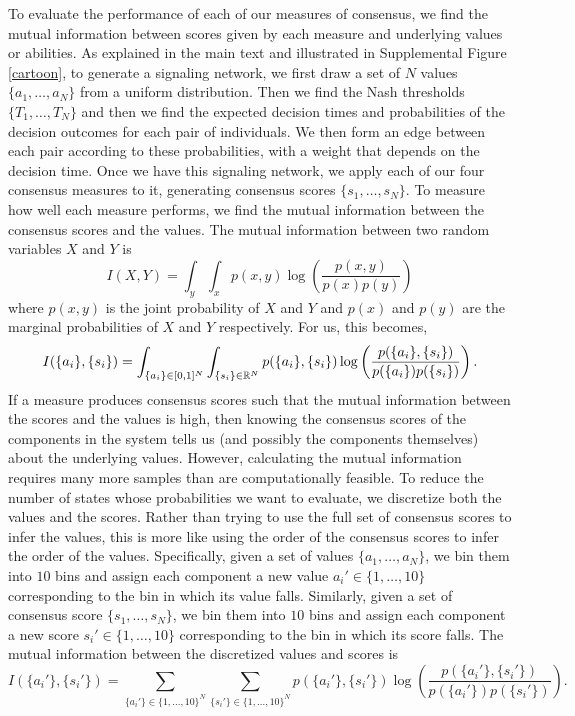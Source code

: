 \documentclass{article}
\begin{document}
To evaluate the performance of each of our measures of consensus, we find the mutual information between scores given by each measure and underlying values or abilities.  As explained in the main text and illustrated in Supplemental Figure \ref{cartoon}, to generate a signaling network, we first draw a set of $N$ values $\{a_1,\dots,a_N\}$ from a uniform distribution. Then we find the Nash thresholds $\{T_1,\dots,T_N\}$ and then we find the expected decision times and probabilities of the decision outcomes for each pair of individuals. We then form an edge between each pair according to these probabilities, with a weight that depends on the decision time.  Once we have this signaling network, we apply each of our four consensus measures to it, generating consensus scores $\{s_1,\dots,s_N\}$.  To measure how well each measure performs, we find the mutual information between the consensus scores and the values. The mutual information between two random variables $X$ and $Y$ is 
\begin{equation}
I(X,Y)=\int_{y}\int_{x}p(x,y)\log\left(\frac{p(x,y)}{p(x)p(y)}\right)
\end{equation}
where $p(x,y)$ is the joint probability of $X$ and $Y$ and $p(x)$ and $p(y)$ are the marginal probabilities of $X$ and $Y$ respectively. For us, this becomes,
\begin{equation}
I(\{a_i\},\{s_i\})=\int_{\{a_i\}\in[0,1]^N}\int_{\{s_i\}\in{\mathbb{R}}^N}p(\{a_i\},\{s_i\})\log\left(\frac{p(\{a_i\},\{s_i\})}{p(\{a_i\})p(\{s_i\})}\right).
\end{equation}
If a measure produces consensus scores such that the mutual information between the scores and the values is high, then knowing the consensus scores of the components in the system tells us (and possibly the components themselves) about the underlying values.  However, calculating the mutual information requires many more samples than are computationally feasible.  To reduce the number of states whose probabilities we want to evaluate, we discretize both the values and the scores.  Rather than trying to use the full set of consensus scores to infer the values, this is more like using the order of the consensus scores to infer the order of the values. Specifically, given a set of values $\{a_1,\dots,a_N\}$, we bin them into $10$ bins and assign each component a new value $a_i'\in\{1,\dots,10\}$ corresponding to the bin in which its value falls.  Similarly, given a set of consensus score $\{s_1,\dots,s_N\}$, we bin them into $10$ bins and assign each component a new score $s_i'\in\{1,\dots,10\}$ corresponding to the bin in which its score falls.  The mutual information between the discretized values and scores is
\begin{equation}
I(\{a_i'\},\{s_i'\})=\sum_{\{a_i'\}\in\{1,\dots,10\}^N}\sum_{\{s_i'\}\in\{1,\dots,10\}^N}p(\{a_i'\},\{s_i'\})\log\left(\frac{p(\{a_i'\},\{s_i'\})}{p(\{a_i'\})p(\{s_i'\})}\right).
\end{equation}
\end{document}

